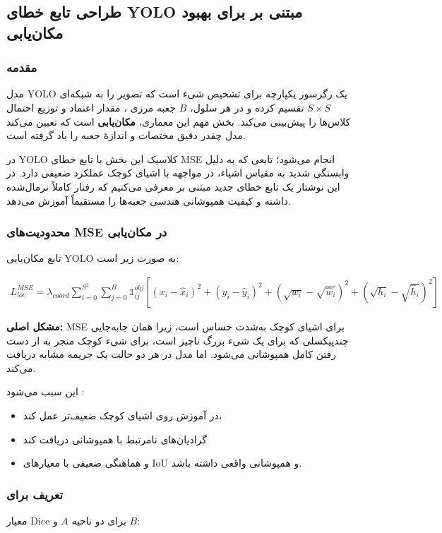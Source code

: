 \documentclass{article}
\begin{document}
\subsection{طراحی تابع خطای YOLO مبتنی بر  برای بهبود مکان‌یابی}

\subsubsection{مقدمه}
مدل YOLO یک رگرسور یکپارچه برای تشخیص شیء است که تصویر را به شبکه‌ای $S \times S$ تقسیم کرده و در هر سلول، $B$ جعبه مرزی ، مقدار اعتماد  و توزیع احتمال کلاس‌ها را پیش‌بینی می‌کند. بخش مهم این معماری، \textbf{مکان‌یابی} است که تعیین می‌کند مدل چقدر دقیق مختصات و اندازهٔ جعبه را یاد گرفته است.

در YOLO کلاسیک این بخش با تابع خطای MSE انجام می‌شود؛ تابعی که به دلیل وابستگی شدید به مقیاس اشیاء، در مواجهه با اشیای کوچک عملکرد ضعیفی دارد. در این نوشتار یک تابع خطای جدید مبتنی بر  معرفی می‌کنیم که رفتار کاملاً نرمال‌شده داشته و کیفیت همپوشانی هندسی جعبه‌ها را مستقیماً آموزش می‌دهد.

\subsubsection{محدودیت‌های MSE در مکان‌یابی}
تابع مکان‌یابی YOLO به صورت زیر است:

$$
\begin{aligned}
	L_{loc}^{MSE} =
	\lambda_{coord} 
	\sum_{i=0}^{S^2} \sum_{j=0}^{B} 
	\mathbb{1}_{ij}^{obj}
	\left[
	(x_i - \hat{x}_i)^2 +
	(y_i - \hat{y}_i)^2 +
	(\sqrt{w_i} - \sqrt{\hat{w}_i})^2 +
	(\sqrt{h_i} - \sqrt{\hat{h}_i})^2
	\right]
\end{aligned}
$$

\textbf{مشکل اصلی:}  
MSE برای اشیای کوچک به‌شدت حساس است، زیرا همان جابه‌جایی چندپیکسلی که برای یک شیء بزرگ ناچیز است، برای شیء کوچک منجر به از دست رفتن کامل همپوشانی می‌شود. اما مدل در هر دو حالت یک جریمه مشابه دریافت می‌کند.

این سبب می‌شود :
\begin{itemize}
	\item در آموزش روی اشیای کوچک ضعیف‌تر عمل کند،
	\item گرادیان‌های نامرتبط با همپوشانی دریافت کند
	\item و هماهنگی ضعیفی با معیارهای IoU و همپوشانی واقعی داشته باشد.
\end{itemize}

\subsubsection{تعریف  برای }
معیار Dice برای دو ناحیه $A$ و $B$:
\end{document}
